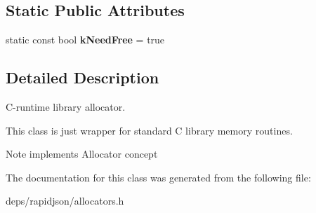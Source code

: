 \subsection*{Static Public Attributes}
\begin{DoxyCompactItemize}
\item 
static const bool {\bfseries k\+Need\+Free} = true\hypertarget{class_crt_allocator_a5198c73448c0e8354435ec95d9d27eea}{}\label{class_crt_allocator_a5198c73448c0e8354435ec95d9d27eea}

\end{DoxyCompactItemize}


\subsection{Detailed Description}
C-\/runtime library allocator. 

This class is just wrapper for standard C library memory routines. \begin{DoxyNote}{Note}
implements Allocator concept 
\end{DoxyNote}


The documentation for this class was generated from the following file\+:\begin{DoxyCompactItemize}
\item 
deps/rapidjson/allocators.\+h\end{DoxyCompactItemize}
